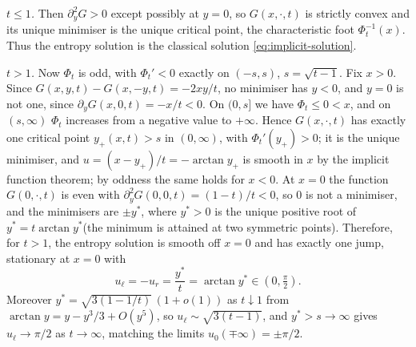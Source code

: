 \emph{$t\le1$.} Then $\partial_y^2G>0$ except possibly at $y=0$, so $G(x,\cdot,t)$ is strictly convex and its unique
minimiser is the unique critical point, the characteristic foot $\Phi_t^{-1}(x)$.
Thus the entropy solution is the classical solution
\eqref{eq:implicit-solution}.

\emph{$t>1$.} Now $\Phi_t$ is odd, with $\Phi_t'<0$ exactly on $(-s,s)$,
$s=\sqrt{t-1}$. Fix $x>0$. Since $G(x,y,t)-G(x,-y,t)=-2xy/t$, no minimiser has
$y<0$, and $y=0$ is not one, since $\partial_yG(x,0,t)=-x/t<0$. On $(0,s]$ we
have $\Phi_t\le0<x$, and on $(s,\infty)$ $\Phi_t$ increases from a negative value
to $+\infty$. Hence $G(x,\cdot,t)$ has exactly one critical point
$y_+(x,t)>s$ in $(0,\infty)$, with $\Phi_t'(y_+)>0$; it is the unique
minimiser, and $u=(x-y_+)/t=-\arctan y_+$ is smooth in $x$ by the implicit
function theorem; by oddness the same holds for $x<0$. At $x=0$ the function
$G(0,\cdot,t)$ is even with $\partial_y^2G(0,0,t)=(1-t)/t<0$, so $0$ is not a
minimiser, and the minimisers are $\pm y^*$, where $y^*>0$ is the unique
positive root of $y^*=t\arctan y^*$(the minimum is attained at two symmetric points). Therefore, for $t>1$, the entropy
solution is smooth off $x=0$ and has exactly one jump, stationary at $x=0$ with
\begin{equation*}
  u_\ell=-u_r=\frac{y^*}{t}=\arctan y^*\in(0,\tfrac\pi2).
\end{equation*}
Moreover $y^*=\sqrt{3(1-1/t)}\,(1+o(1))$ as $t\downarrow1$ from
$\arctan y=y-y^3/3+O(y^5)$, so $u_\ell\sim\sqrt{3(t-1)}$, and $y^*>s\to\infty$
gives $u_\ell\to\pi/2$ as $t\to\infty$, matching the limits $u_0(\mp\infty)=\pm\pi/2$.